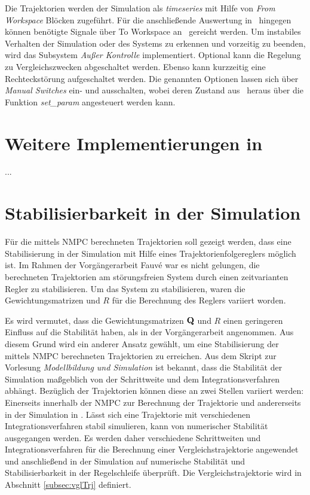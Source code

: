 Die Trajektorien werden der Simulation als \textit{timeseries} mit Hilfe von \textit{From Workspace} Blöcken zugeführt. Für die anschließende Auswertung in \Matlab\ hingegen können benötigte Signale über To Workspace an \Matlab\ gereicht werden. Um instabiles Verhalten der Simulation oder des Systems zu erkennen und vorzeitig zu beenden, wird das Subsystem \textit{Außer Kontrolle} implementiert. Optional kann die Regelung zu Vergleichszwecken abgeschaltet werden. Ebenso kann kurzzeitig eine Rechteckstörung aufgeschaltet werden. Die genannten Optionen lassen sich über \textit{Manual Switches} ein- und ausschalten, wobei deren Zustand aus \Matlab\ heraus über die Funktion \textit{set\_param} angesteuert werden kann.

\section{Weitere Implementierungen in \Matlab}
...


\section{Stabilisierbarkeit in der Simulation}

Für die mittels NMPC berechneten Trajektorien soll gezeigt werden, dass eine Stabilisierung in der Simulation mit Hilfe eines Trajektorienfolgereglers möglich ist. Im Rahmen der Vorgängerarbeit Fauvé \cite{fauve} war es nicht gelungen, die berechneten Trajektorien am störungsfreien System durch einen zeitvarianten Regler zu stabilisieren. Um das System zu stabilisieren, waren die Gewichtungsmatrizen  und $R$ für die Berechnung des Reglers variiert worden.

Es wird vermutet, dass die Gewichtungsmatrizen ${\boldsymbol{\mathrm{Q}}}$ und $R$ einen geringeren Einfluss auf die Stabilität haben, als in der Vorgängerarbeit angenommen. 
Aus diesem Grund wird ein anderer Ansatz gewählt, um eine Stabilisierung der mittels NMPC berechneten Trajektorien zu erreichen. Aus dem Skript \cite{modsim} zur Vorlesung \textit{Modellbildung und Simulation} ist bekannt, dass die Stabilität der Simulation maßgeblich von der Schrittweite und dem Integrationsverfahren abhängt. Bezüglich der Trajektorien können diese an zwei Stellen variiert werden: Einerseits innerhalb der NMPC zur Berechnung der Trajektorie und andererseits in der Simulation in \Simulink. Lässt sich eine Trajektorie mit verschiedenen Integrationsverfahren stabil simulieren, kann von numerischer Stabilität ausgegangen werden. Es werden daher verschiedene Schrittweiten und Integrationsverfahren für die Berechnung einer Vergleichstrajektorie angewendet und anschließend in der Simulation auf numerische Stabilität und Stabilisierbarkeit in der Regelschleife überprüft. Die Vergleichstrajektorie wird in Abschnitt \ref{subsec:vglTrj} definiert.

